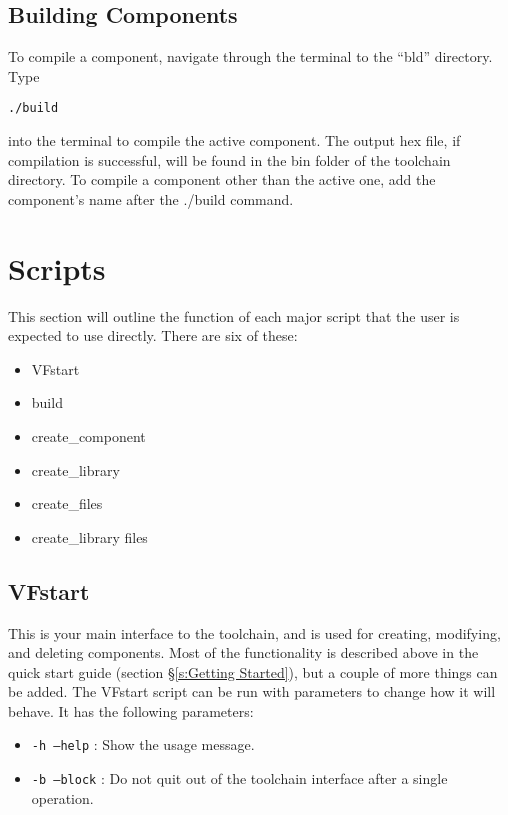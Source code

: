 \documentclass[a4paper, oneside, 11pt, titlepage, onecolumn, openright]{article}
\begin{document}
	\subsection{Building Components}
			\label{ss:CompilingComponents}

			To compile a component, navigate through the terminal to the ``bld'' directory. Type

\begin{lstlisting}
./build
\end{lstlisting}

into the terminal to compile the active component. The output hex file, if compilation is successful, will be found in the bin folder of the toolchain directory.
			To compile a component other than the active one, add the component's name after the ./build command. 
			
\section{Scripts}
			\label{s:Scripts}
			This section will outline the function of each major script that the user is expected to use directly.
			There are six of these:
			
\begin{itemize}
\item VFstart
\item build
\item create\_component
\item create\_library
\item create\_files
\item create\_library files
\end{itemize} 

	\subsection{VFstart}
			\label{ss:VFstart}
			This is your main interface to the toolchain, and is used for creating, modifying, and deleting components. Most of the functionality is described above in the quick start guide (section \S\ref{s:Getting Started}), but a couple of more things can be added.
			The VFstart script can be run with parameters to change how it will behave. It has the following parameters:
	
\begin{itemize}
\item \texttt{-h --help} : Show the usage message.
\item \texttt{-b --block} : Do not quit out of the toolchain interface after a single operation.
\end{itemize} 		
\end{document}
